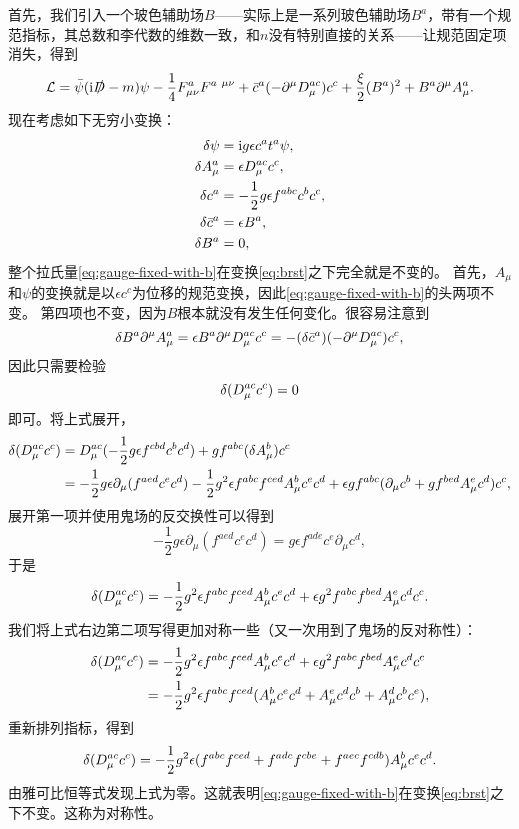 首先，我们引入一个玻色辅助场$B$——实际上是一系列玻色辅助场$B^a$，带有一个规范指标，其总数和李代数的维数一致，和$n$没有特别直接的关系——让规范固定项消失，得到
\begin{equation}
    \mathcal{L} = \bar{\psi} (\mathrm{i} \slashed{D} - m) \psi - \frac{1}{4} F_{\mu \nu}^a F^{a \ \mu \nu} + \bar{c}^a (- \partial^\mu D_\mu^{ac}) c^c + \frac{\xi}{2} (B^a)^2 + B^a  \partial^\mu A_\mu^a. 
    \label{eq:gauge-fixed-with-b}
\end{equation}
现在考虑如下无穷小变换：
\begin{equation}
    \begin{aligned}
        \var{\psi} &= \mathrm{i} g \epsilon c^a t^a \psi, \\
        \var{A^a_\mu} &= \epsilon D_\mu^{ac} c^c, \\
        \var{c^a} &= - \frac{1}{2} g \epsilon f^{abc} c^b c^c, \\
        \var{\bar{c}^a} &= \epsilon B^a, \\
        \var{B^a} &= 0,
    \end{aligned}
    \label{eq:brst}
\end{equation}
整个拉氏量\eqref{eq:gauge-fixed-with-b}在变换\eqref{eq:brst}之下完全就是不变的。
首先，$A_\mu$和$\psi$的变换就是以$\epsilon c^c$为位移的规范变换，因此\eqref{eq:gauge-fixed-with-b}的头两项不变。
第四项也不变，因为$B$根本就没有发生任何变化。很容易注意到
\[
    \var{B^a \partial^\mu A_\mu^a} = \epsilon B^a \partial^\mu D_\mu^{ac} c^c = - (\var{\bar{c}^a}) (- \partial^\mu D_\mu^{ac}) c^c,
\]
因此只需要检验
\[
    \var{(D_\mu^{ac} c^c)} = 0
\]
即可。将上式展开，
\[
    \begin{aligned}
        \var{(D_\mu^{ac} c^c)} &= D^{ac}_\mu (- \frac{1}{2} g \epsilon f^{cbd} c^b c^d) + g f^{abc} (\var{A_\mu^b}) c^c \\
        &= - \frac{1}{2} g \epsilon \partial_\mu (f^{aed} c^e c^d) - \frac{1}{2} g^2 \epsilon f^{abc} f^{ced} A_\mu^b c^e c^d + \epsilon g f^{abc} (\partial_\mu c^b + g f^{bed} A_\mu^e c^d) c^c ,
    \end{aligned}
\]
展开第一项并使用鬼场的反交换性可以得到
\[
    - \frac{1}{2} g \epsilon \partial_\mu (f^{aed} c^e c^d) = g \epsilon f^{ade} c^e \partial_\mu c^d,
\]
于是
\[
    \var{(D_\mu^{ac} c^c)} = - \frac{1}{2} g^2 \epsilon f^{abc} f^{ced} A_\mu^b c^e c^d + \epsilon g^2 f^{abc} f^{bed} A_\mu^e c^d c^c.
\]
我们将上式右边第二项写得更加对称一些（又一次用到了鬼场的反对称性）：
\[
    \begin{aligned}
        \var{(D_\mu^{ac} c^c)} &= - \frac{1}{2} g^2 \epsilon f^{abc} f^{ced} A_\mu^b c^e c^d + \epsilon g^2 f^{abc} f^{bed} A_\mu^e c^d c^c \\
        &= - \frac{1}{2} g^2 \epsilon f^{abc} f^{ced} (A_\mu^b c^e c^d + A^e_\mu c^d c^b + A_\mu^d c^b c^e),
    \end{aligned}
\]
重新排列指标，得到
\[
    \var{(D_\mu^{ac} c^c)} = - \frac{1}{2} g^2 \epsilon (f^{abc} f^{ced} + f^{adc} f^{cbe} + f^{aec} f^{cdb}) A_\mu^b c^e c^d.
\]
由雅可比恒等式发现上式为零。这就表明\eqref{eq:gauge-fixed-with-b}在变换\eqref{eq:brst}之下不变。这称为对称性。

